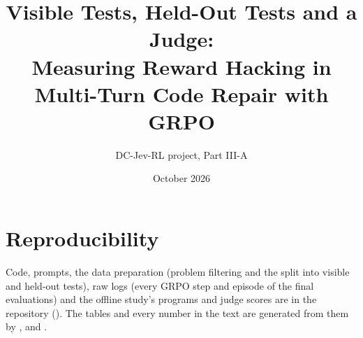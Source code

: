 \documentclass[11pt]{article}
\title{Visible Tests, Held-Out Tests and a Judge:\\Measuring Reward Hacking in Multi-Turn Code Repair with GRPO}
\author{DC-Jev-RL project, Part III-A}
\date{October 2026}
\begin{document}
\maketitle

\begin{abstract}

\end{abstract}







\section*{Reproducibility}
Code, prompts, the data preparation (problem filtering and the split into visible and held-out tests), raw logs (every
GRPO step and episode of the final evaluations) and the offline study's programs and judge scores are in the repository
(). The tables and every number in the text are generated from them by
,  and .



\end{document}
